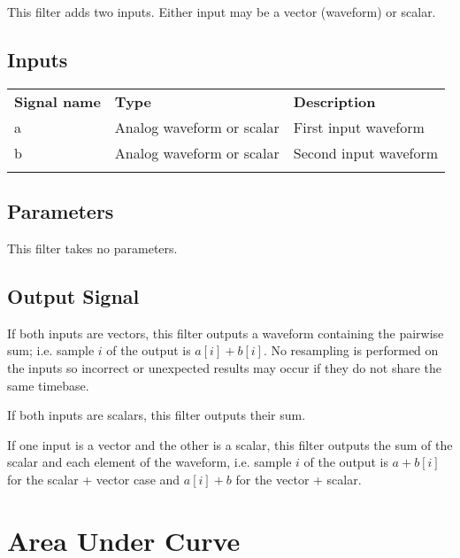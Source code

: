 This filter adds two inputs. Either input may be a vector (waveform) or scalar.


\subsection{Inputs}

\begin{tabularx}{16cm}{llX}
\thickhline
\textbf{Signal name} & \textbf{Type} & \textbf{Description} \\
\thickhline
a & Analog waveform or scalar & First input waveform\\
\thinhline
b & Analog waveform or scalar & Second input waveform\\
\thickhline
\end{tabularx}

\subsection{Parameters}

This filter takes no parameters.

\subsection{Output Signal}

If both inputs are vectors, this filter outputs a waveform containing the pairwise sum; i.e. sample $i$ of the output
is $a[i] + b[i]$. No resampling is performed on the inputs so incorrect or unexpected results may occur if they do not
share the same timebase.

If both inputs are scalars, this filter outputs their sum.

If one input is a vector and the other is a scalar, this filter outputs the sum  of the scalar and each element of the
waveform, i.e. sample $i$ of the output is $a + b[i]$ for the scalar + vector case and $a[i] + b$ for the vector +
scalar.


\pagebreak
\section{Area Under Curve}
\label{filter:AreaUnderCurve}

